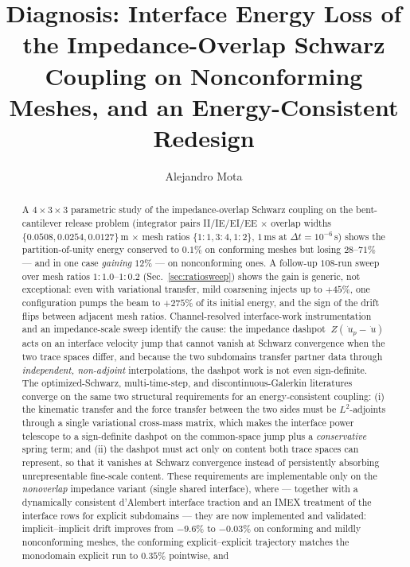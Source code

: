 \documentclass[11pt]{article}
\title{Diagnosis: Interface Energy Loss of the Impedance-Overlap Schwarz\\
Coupling on Nonconforming Meshes, and an Energy-Consistent Redesign}
\author{Alejandro Mota}
\begin{document}
\maketitle

\begin{abstract}
A $4\times3\times3$ parametric study of the impedance-overlap Schwarz coupling
on the bent-cantilever release problem (integrator pairs II/IE/EI/EE $\times$
overlap widths $\{0.0508, 0.0254, 0.0127\}$\,m $\times$ mesh ratios
$\{1{:}1, 3{:}4, 1{:}2\}$, $1$\,ms at $\Delta t = 10^{-6}$\,s) shows the
partition-of-unity energy conserved to $0.1\%$ on conforming meshes but losing
$28$--$71\%$ --- and in one case \emph{gaining} $12\%$ --- on nonconforming
ones. A follow-up $108$-run sweep over mesh ratios $1{:}1.0$--$1{:}0.2$
(Sec.~\ref{sec:ratiosweep}) shows the gain is generic, not exceptional: even
with variational transfer, mild coarsening injects up to $+45\%$, one
configuration pumps the beam to $+275\%$ of its initial energy, and the sign
of the drift flips between adjacent mesh ratios. Channel-resolved interface-work instrumentation and an impedance-scale
sweep identify the cause: the impedance dashpot $~Z(\dot{~u}_p - \dot{~u})$
acts on an interface velocity jump that cannot vanish at Schwarz convergence
when the two trace spaces differ, and because the two subdomains transfer
partner data through \emph{independent, non-adjoint} interpolations, the
dashpot work is not even sign-definite. The optimized-Schwarz, multi-time-step,
and discontinuous-Galerkin literatures converge on the same two structural
requirements for an energy-consistent coupling: (i) the kinematic transfer and
the force transfer between the two sides must be $L^2$-adjoints through a
single variational cross-mass matrix, which makes the interface power telescope to
a sign-definite dashpot on the common-space jump plus a \emph{conservative}
spring term; and (ii) the dashpot must act only on content both trace spaces
can represent, so that it vanishes at Schwarz convergence instead of
persistently absorbing unrepresentable fine-scale content. These requirements
are implementable only on the \emph{nonoverlap} impedance variant (single
shared interface), where --- together with a dynamically consistent
d'Alembert interface traction and an IMEX treatment of the interface rows
for explicit subdomains --- they are now implemented and validated:
implicit--implicit drift improves from $-9.6\%$ to $-0.03\%$ on conforming
and mildly nonconforming meshes, the conforming explicit--explicit
trajectory matches the monodomain explicit run to $0.35\%$ pointwise, and

\end{abstract}
\end{document}
